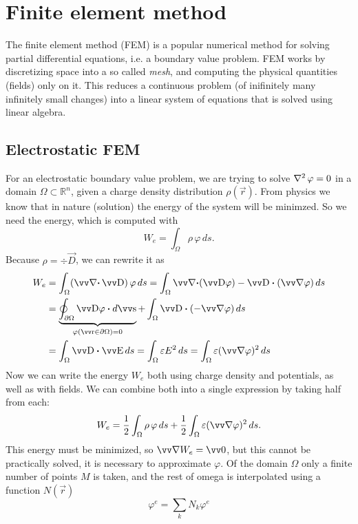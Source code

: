 \documentclass[margin=small]{tex/hsrzf}
\theoremstyle{elmagzf}
\begin{document}
\section{Finite element method}

The finite element method (FEM) is a popular numerical method for solving
partial differential equations, i.e. a boundary value problem. FEM works by
discretizing space into a so called \emph{mesh}, and computing the physical
quantities (fields) only on it. This reduces a continuous problem (of
inifinitely many infinitely small changes) into a linear system of equations
that is solved using linear algebra.

\subsection{Electrostatic FEM}

For an electrostatic boundary value problem, we are trying to solve \(\operatorname{\nabla^2}
\varphi = 0\) in a domain \(\Omega \subset \mathbb{R}^n\), given a charge
density distribution \(\rho(\vec{r})\). From physics we know that in nature
(solution) the energy of the system will be minimzed. So we need the energy,
which is computed with
\[
  W_e = \int_\Omega \rho \, \varphi \, ds.
\]
Because \(\rho = \div \vec{D}\), we can rewrite it as
\begin{align*}
  W_e &= \int_\Omega (\div \vec{D}) \, \varphi \, ds
       = \int_\Omega \div (\vec{D} \varphi) - \vec{D} \dotp (\grad \varphi) \, ds \\
      &= \underbrace{\oint_{\partial \Omega} \vec{D} \varphi \dotp d\vec{s}}_{
        \varphi(\vec{r} \in \partial \Omega) = 0
      }
         + \int_\Omega \vec{D} \dotp (-\grad \varphi) \, ds \\
      &= \int_\Omega \vec{D} \dotp \vec{E} \, ds
       = \int_\Omega \varepsilon E^2 \, ds
       = \int_\Omega \varepsilon (\grad \varphi)^2 \, ds
\end{align*}
Now we can write the energy \(W_e\) both using charge density and potentials,
as well as with fields. We can combine both into a single expression by taking
half from each:
\begin{equation}
  W_e = \frac{1}{2} \int_\Omega \rho \, \varphi \, ds
        + \frac{1}{2} \int_\Omega \varepsilon (\grad \varphi)^2 \, ds.
\end{equation}
This energy must be minimized, so \(\grad W_e = \vec{0}\), but this cannot be
practically solved, it is necessary to approximate \(\varphi\). Of the domain
\(\Omega\) only a finite number of points \(M\) is taken, and the rest of omega
is interpolated using a function \(N(\vec{r})\)
\begin{equation}
  \varphi^e = \sum_k N_k \varphi^e
\end{equation}
\end{document}
